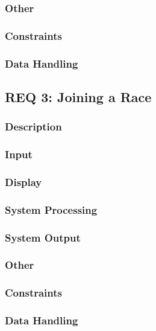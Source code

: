 \documentclass[a4paper, 11pt]{article} %
\begin{document}
\subsubsection{Other}

\subsubsection{Constraints}

\subsubsection{Data Handling}

\newpage

\subsection{REQ 3: Joining a Race}

\subsubsection{Description}

\subsubsection{Input}

\subsubsection{Display}

\subsubsection{System Processing}

\subsubsection{System Output}

\subsubsection{Other}

\subsubsection{Constraints}

\subsubsection{Data Handling}
\end{document}
